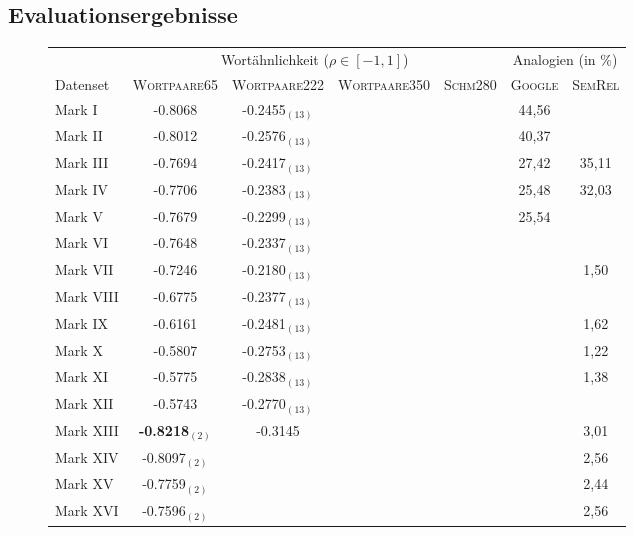   \subsection{Evaluationsergebnisse}

  \newpage
  \begin{landscape}
  \begin{figure}[h]
    \centering
    \begin{tabular}{l||c|c|c|c||c|c}
       & \multicolumn{4}{c}{Wortähnlichkeit ($\rho \in [-1, 1]$)} & \multicolumn{2}{c}{Analogien (in \%)} \\
      Datenset & \textsc{Wortpaare65} & \textsc{Wortpaare222} & \textsc{Wortpaare350} & \textsc{Schm280} & \textsc{Google} & \textsc{SemRel} \\
      \hline \hline
      Mark I & -0.8068 & -0.2455$_{(13)}$& & & 44,56 & \\
      \hline
      Mark II & -0.8012 & -0.2576$_{(13)}$ & & & 40,37 &  \\
      \hline
      Mark III & -0.7694 & -0.2417$_{(13)}$& & & 27,42 & 35,11 \\
      \hline
      Mark IV & -0.7706 & -0.2383$_{(13)}$& & & 25,48 & 32,03 \\
      \hline
      Mark V & -0.7679 & -0.2299$_{(13)}$ & & & 25,54 &  \\
      \hline
      Mark VI & -0.7648 & -0.2337$_{(13)}$ & & & &  \\
      \hline
      Mark VII & -0.7246 & -0.2180$_{(13)}$ & & & & 1,50  \\
      \hline
      Mark VIII & -0.6775 & -0.2377$_{(13)}$ & & & &  \\
      \hline
      Mark IX & -0.6161 & -0.2481$_{(13)}$ & & & & 1,62 \\
      \hline
      Mark X & -0.5807 & -0.2753$_{(13)}$ & & & & 1,22 \\
      \hline
      Mark XI & -0.5775 & -0.2838$_{(13)}$ & & & & 1,38  \\
      \hline
      Mark XII & -0.5743 & -0.2770$_{(13)}$ & & & &  \\
      \hline
      Mark XIII & \textbf{-0.8218}$_{(2)}$ & -0.3145 & & & & 3,01 \\
      \hline
      Mark XIV & -0.8097$_{(2)}$ &  & & & & 2,56 \\
      \hline
      Mark XV & -0.7759$_{(2)}$ &  & & & & 2,44 \\
      \hline
      Mark XVI & -0.7596$_{(2)}$ & & & & & 2,56 \\
      \hline

\end{tabular}
\end{figure}
\end{landscape}
